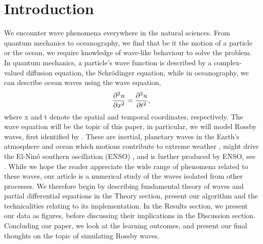 \section{Introduction}
\label{sec:introduction}

We encounter wave phenomena everywhere in the natural sciences. From quantum mechanics to oceanography, we find that be it the motion of a particle or the ocean, we require knowledge of wave-like behaviour to solve the problem. In quantum mechanics, a particle's wave function is described by a complex-valued diffusion equation, the Schrödinger equation, while in oceanography, we can describe ocean waves using the wave equation,
	\begin{equation}
	\label{eq:wave}
	\pdv[2]{u}{x} = \pdv[2]{u}{t},
	\end{equation}
where x and t denote the spatial and temporal coordinates, respectively. The wave equation will be the topic of this paper, in particular, we will model Rossby waves, first identified by \citet{rossby}. These are inertial, planetary waves in the Earth's atmosphere and ocean which motions contribute to extreme weather \citep{mann2017influence}, might drive the El-Ninõ southern oscillation (ENSO) \citep{bosc2008observed}, and is further produced by ENSO, see \citet{battisti1989role}. While we hope the reader appreciate the wide range of phenomena related to these waves, our article is a numerical study of the waves isolated from other processes. We therefore begin by describing fundamental theory of waves and partial differential equations in the Theory section, present our algorithm and the technicalities relating to its implementation. In the Results section, we present our data as figures, before discussing their implications in the Discussion section. Concluding our paper, we look at the learning outcomes, and present our final thoughts on the topic of simulating Rossby waves.